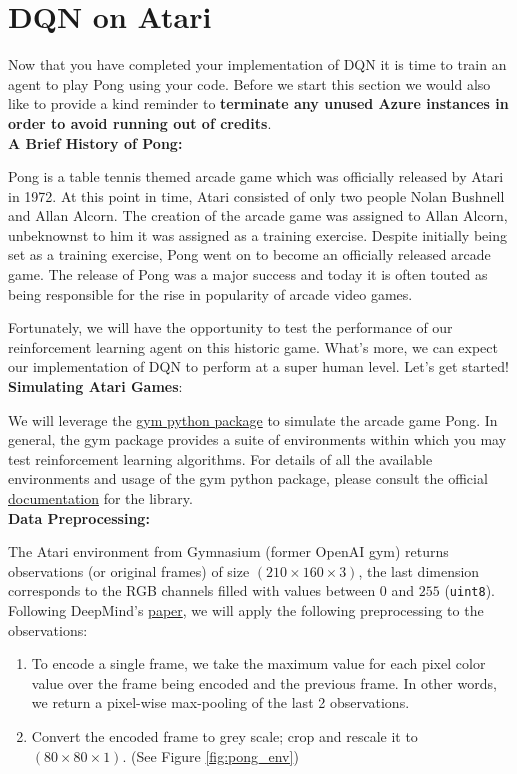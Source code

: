 \section{DQN on Atari}

Now that you have completed your implementation of DQN it is time to train an agent to play Pong using your code. Before we start this section we would also like to provide a kind reminder to \textbf{terminate any unused Azure instances in order to avoid running out of credits}. \\

\textbf{A Brief History of Pong:}

Pong is a table tennis themed arcade game which was officially released by Atari in 1972. At this point in time, Atari consisted of only two people Nolan Bushnell and Allan Alcorn. The creation of the arcade game was assigned to Allan Alcorn, unbeknownst to him it was assigned as a training exercise. Despite initially being set as a training exercise, Pong went on to become an officially released arcade game. The release of Pong was a major success and today it is often touted as being responsible for the rise in popularity of arcade video games.

Fortunately, we will have the opportunity to test the performance of our reinforcement learning agent on this historic game. What's more, we can expect our implementation of DQN to perform at a super human level. Let's get started! \\

\textbf{Simulating Atari Games}:

We will leverage the \href{https://www.gymlibrary.dev/}{gym python package} to simulate the arcade game Pong. In general, the gym package provides a suite of environments within which you may test reinforcement learning algorithms. For details of all the available environments and usage of the gym python package, please consult the official \href{https://www.gymlibrary.dev/}{documentation} for the library. \\

\textbf{Data Preprocessing:}

The Atari environment from Gymnasium (former OpenAI gym) returns observations (or original frames) of size $ (210 \times 160 \times 3) $, the last dimension corresponds to the RGB channels filled with values between $ 0 $ and $ 255 $ (\texttt{uint8}). Following DeepMind's \href{https://storage.googleapis.com/deepmind-media/dqn/DQNNaturePaper.pdf}{paper}, we will apply the following preprocessing to the observations:
\begin{enumerate}[1.]
\item To encode a single frame, we take the maximum value for each pixel color value over the frame being encoded and the previous frame. In other words, we return a pixel-wise max-pooling of the last 2 observations.
\item Convert the encoded frame to grey scale; crop and rescale it to $(80 \times 80 \times 1)$. (See Figure \ref{fig:pong_env})
\end{enumerate}

